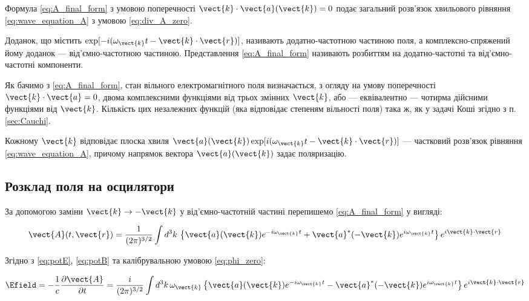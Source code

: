 Формула \eqref{eq:A_final_form} з умовою поперечності \(\vect{k} \cdot \vect{a}(\vect{k}) = 0\) подає загальний розв’язок хвильового рівняння
\eqref{eq:wave_equation_A} з умовою \eqref{eq:div_A_zero}.

Доданок, що містить \(\exp[-i(\omega_{\vect{k}} t - \vect{k} \cdot \vect{r})]\), називають додатно-частотною частиною поля, а комплексно-спряжений йому
доданок --- від’ємно-частотною частиною. Представлення \eqref{eq:A_final_form} називають розбиттям на додатно-частотні та від’ємно-частотні компоненти.

Як бачимо з \eqref{eq:A_final_form}, стан вільного електромагнітного поля визначається, з огляду на умову поперечності \(\vect{k} \cdot \vect{a} = 0\),
двома комплексними функціями від трьох змінних \(\vect{k}\), або --- еквівалентно --- чотирма дійсними функціями від \(\vect{k}\). Кількість цих
незалежних функцій (яка відповідає степеням вільності поля) така ж, як у задачі Коші згідно з п. \ref{sec:Cauchi}.

Кожному \(\vect{k}\) відповідає плоска хвиля \(\vect{a}(\vect{k}) \exp[i(\omega_{\vect{k}} t - \vect{k} \cdot \vect{r})]\) --- частковий розв’язок
рівняння \eqref{eq:wave_equation_A}, причому напрямок вектора \(\vect{a}(\vect{k})\) задає поляризацію.

\subsection*{Розклад поля на осцилятори}

За допомогою заміни \(\vect{k} \rightarrow -\vect{k}\) у від’ємно-частотній частині перепишемо \eqref{eq:A_final_form} у вигляді:

\begin{equation}
\vect{A}(t, \vect{r}) = \frac{1}{(2\pi)^{3/2}} \int d^3k \, \left\{ \vect{a}(\vect{k}) e^{-i\omega_{\vect{k}} t} + \vect{a}^*(-\vect{k})
e^{i\omega_{\vect{k}} t} \right\} e^{i\vect{k} \cdot \vect{r}}
\label{eq:A_final_form_modified}
\end{equation}

Згідно з \eqref{eq:potE}, \eqref{eq:potB} та калібрувальною умовою \eqref{eq:phi_zero}:

\begin{equation}
\Efield = -\frac{1}{c} \frac{\partial \vect{A}}{\partial t} = \frac{i}{(2\pi)^{3/2}} \int d^3k \, \omega_{\vect{k}} \left\{ \vect{a}(\vect{k})
e^{-i\omega_{\vect{k}} t} - \vect{a}^*(-\vect{k}) e^{i\omega_{\vect{k}} t} \right\} e^{i\vect{k} \cdot \vect{r}}
\label{eq:E_field_fourier}
\end{equation}

